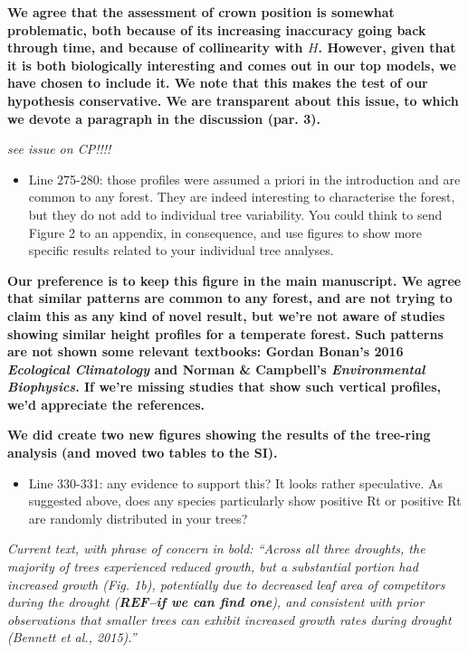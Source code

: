 \documentclass[
]{article}
\providecommand{\tightlist}{%
  \setlength{\itemsep}{0pt}\setlength{\parskip}{0pt}}
\begin{document}
\textbf{We agree that the assessment of crown position is somewhat
problematic, both because of its increasing inaccuracy going back
through time, and because of collinearity with \(H\). However, given
that it is both biologically interesting and comes out in our top
models, we have chosen to include it. We note that this makes the test
of our hypothesis conservative. We are transparent about this issue, to
which we devote a paragraph in the discussion (par. 3).}

\emph{see issue on CP!!!!}

\begin{itemize}
\tightlist
\item
  Line 275-280: those profiles were assumed a priori in the introduction
  and are common to any forest. They are indeed interesting to
  characterise the forest, but they do not add to individual tree
  variability. You could think to send Figure 2 to an appendix, in
  consequence, and use figures to show more specific results related to
  your individual tree analyses.
\end{itemize}

\textbf{Our preference is to keep this figure in the main manuscript. We
agree that similar patterns are common to any forest, and are not trying
to claim this as any kind of novel result, but we're not aware of
studies showing similar height profiles for a temperate forest. Such
patterns are not shown some relevant textbooks: Gordan Bonan's 2016
\emph{Ecological Climatology} and Norman \& Campbell's
\emph{Environmental Biophysics}. If we're missing studies that show such
vertical profiles, we'd appreciate the references.}

\textbf{We did create two new figures showing the results of the
tree-ring analysis (and moved two tables to the SI).}

\begin{itemize}
\tightlist
\item
  Line 330-331: any evidence to support this? It looks rather
  speculative. As suggested above, does any species particularly show
  positive Rt or positive Rt are randomly distributed in your trees?
\end{itemize}

\emph{Current text, with phrase of concern in bold: ``Across all three
droughts, the majority of trees experienced reduced growth, but a
substantial portion had increased growth (Fig. 1b), potentially due to
decreased leaf area of competitors during the drought (\textbf{REF--if
we can find one}), and consistent with prior observations that smaller
trees can exhibit increased growth rates during drought (Bennett
\emph{et al.}, 2015).'' }
\end{document}
